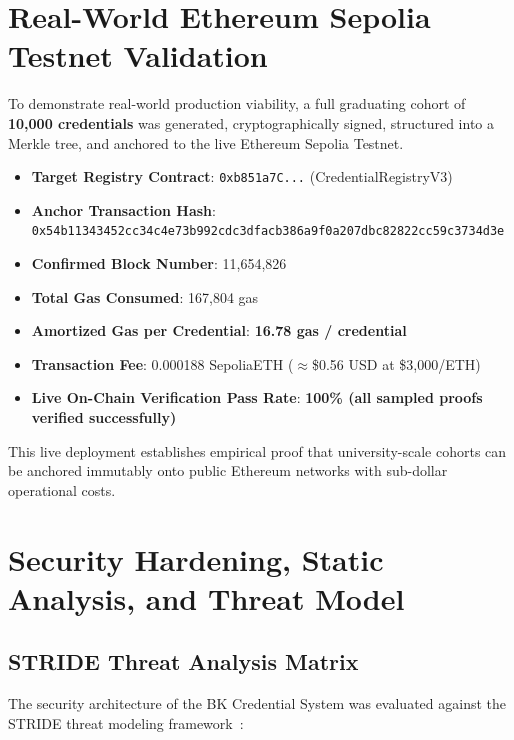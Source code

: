 \section{Real-World Ethereum Sepolia Testnet Validation}

To demonstrate real-world production viability, a full graduating cohort of \textbf{10,000 credentials} was generated, cryptographically signed, structured into a Merkle tree, and anchored to the live Ethereum Sepolia Testnet.

\begin{itemize}
    \item \textbf{Target Registry Contract}: \texttt{0xb851a7C...} (CredentialRegistryV3)
    \item \textbf{Anchor Transaction Hash}: \texttt{0x54b11343452cc34c4e73b992cdc3dfacb386a9f0a207dbc82822cc59c3734d3e}
    \item \textbf{Confirmed Block Number}: 11,654,826
    \item \textbf{Total Gas Consumed}: 167,804 gas
    \item \textbf{Amortized Gas per Credential}: \textbf{16.78 gas / credential}
    \item \textbf{Transaction Fee}: 0.000188 SepoliaETH ($\approx$\$0.56 USD at \$3,000/ETH)
    \item \textbf{Live On-Chain Verification Pass Rate}: \textbf{100\% (all sampled proofs verified successfully)}
\end{itemize}

This live deployment establishes empirical proof that university-scale cohorts can be anchored immutably onto public Ethereum networks with sub-dollar operational costs.

\section{Security Hardening, Static Analysis, and Threat Model}

\subsection{STRIDE Threat Analysis Matrix}

The security architecture of the BK Credential System was evaluated against the STRIDE threat modeling framework~\cite{Cachin2017Blockchain}:

